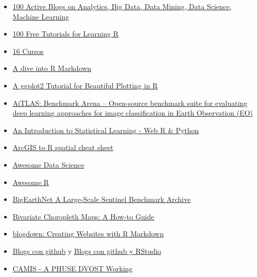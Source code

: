\documentclass[
]{article}
\providecommand{\tightlist}{%
  \setlength{\itemsep}{0pt}\setlength{\parskip}{0pt}}
\begin{document}
\begin{itemize}
\tightlist
\item
  \href{https://www.kdnuggets.com/2016/03/100-active-blogs-analytics-big-data-science-machine-learning.html\#.VvqjkSV5Tio.linkedin}{100
  Active Blogs on Analytics, Big Data, Data Mining, Data Science,
  Machine Learning}
\item
  \href{https://www.listendata.com/p/r-programming-tutorials.html}{100
  Free Tutorials for Learning R}
\item
  \href{https://www.analyticsvidhya.com/blog/2016/10/16-new-must-watch-tutorials-courses-on-machine-learning/?utm_source=feedburner&utm_medium=email&utm_campaign=Feed\%3A+AnalyticsVidhya+\%28Analytics+Vidhya\%29}{16
  Cursos}
\item
  \href{http://cfss.uchicago.edu/program_rmarkdown.html}{A dive into R
  Markdown}
\item
  \href{https://cedricscherer.netlify.app/2019/08/05/a-ggplot2-tutorial-for-beautiful-plotting-in-r/}{A
  ggplot2 Tutorial for Beautiful Plotting in R}
\item
  \href{https://github.com/biasvariancelabs/aitlas-arena}{AiTLAS:
  Benchmark Arena -- Open-source benchmark suite for evaluating deep
  learning approaches for image classification in Earth Observation
  (EO)}
\item
  \href{https://www.statlearning.com/}{An Introduction to Statistical
  Learning - Web R \& Python}
\item
  \href{http://www.seascapemodels.org/data/ArcGIS_to_R_Spatial_CheatSheet.pdf}{ArcGIS
  to R spatial cheat sheet}
\item
  \href{https://github.com/academic/awesome-datascience}{Awesome Data
  Science}
\item
  \href{https://github.com/qinwf/awesome-R}{Awesome R}
\item
  \href{https://bigearth.net/}{BigEarthNet A Large-Scale Sentinel
  Benchmark Archive}
\item
  \href{https://www.joshuastevens.net/cartography/make-a-bivariate-choropleth-map/}{Bivariate
  Choropleth Maps: A How-to Guide}
\item
  \href{https://bookdown.org/yihui/blogdown/}{blogdown: Creating
  Websites with R Markdown}
\item
  \href{http://jmcglone.com/guides/github-pages/}{Blogs con github} y
  \href{http://andysouth.github.io/blog-setup/}{Blogs con github y
  RStudio}
\item
  \href{https://psiaims.github.io/CAMIS/}{CAMIS - A PHUSE DVOST Working
}
\end{itemize}
\end{document}
